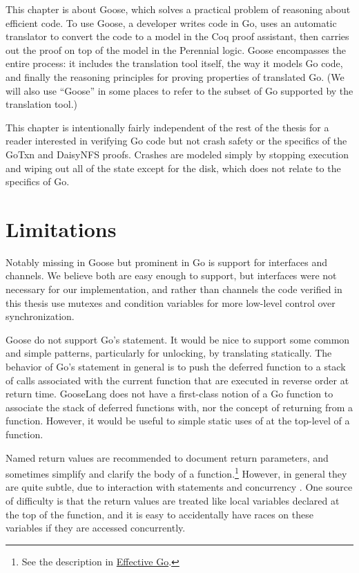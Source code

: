 This chapter is about Goose, which solves a practical
problem of reasoning about efficient code. To use Goose, a developer writes
code in Go, uses an automatic translator to convert the code to a model in the Coq proof
assistant, then carries out the proof on top of the model in the Perennial logic. Goose encompasses
the entire process: it includes the translation tool itself, the way it models Go
code, and finally the reasoning principles for proving properties of translated
Go. (We will also use ``Goose'' in some places to refer to the subset of Go
supported by the translation tool.)

This chapter is intentionally fairly independent of the rest of the thesis for a
reader interested in verifying Go code but not crash safety or the specifics of
the GoTxn and DaisyNFS proofs. Crashes are modeled simply by stopping
execution and wiping out all of the state except for the disk, which does not
relate to the specifics of Go.









\section{Limitations}%
\label{sec:goose:limitations}

Notably missing in Goose but prominent in Go is support for interfaces
and channels. We believe both are easy enough to support, but interfaces
were not necessary for our implementation, and rather than channels the code
verified in this thesis
use mutexes and condition variables for more low-level control over
synchronization.

Goose do not support Go's  statement. It would be nice to support some
common and simple patterns, particularly for unlocking, by translating
 statically. The behavior of Go's  statement in general is
to push the deferred function to a stack of calls associated with the current function that are executed in reverse order at return
time. GooseLang does not have a first-class notion of a Go function to associate
the stack of deferred functions with, nor the concept of returning
from a function. However, it would be useful to simple static uses of 
at the top-level of a function.

Named return values are recommended to document return parameters, and sometimes
simplify and clarify the body of a function.\footnote{See the description in
\href{https://go.dev/doc/effective_go\#named-results}{Effective Go}.} However, in
general they are quite subtle, due to interaction with  statements and
concurrency . One source of difficulty is that the
return values are treated like local variables declared at the top of the
function, and it is easy to accidentally have races on these variables if they
are accessed concurrently.

